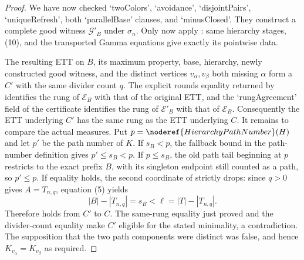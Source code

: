 \begin{proof}
We have now checked `twoColors', `avoidance', `disjointPairs',
`uniqueRefresh', both `parallelBase' clauses, and `minusClosed'.  They
construct a complete good witness $\mathcal G'_B$ under $\sigma_n$.
Only now apply : same hierarchy stages,
(10), and the transported Gamma equations give exactly its pointwise
data.

The resulting ETT on $B$, its maximum property, base, hierarchy, newly
constructed good witness, and the distinct vertices $v_\alpha,v_\beta$
both missing $\alpha$ form a  $C'$ with
the same divider count $q$.  The explicit rounds equality returned by
 identifies the rung of
$\mathcal E_B$ with that of the original ETT, and the `rungAgreement'
field of the  certificate
identifies the rung of $\mathcal E'_B$ with that of $\mathcal E_B$.
Consequently the ETT underlying $C'$ has the same rung as the ETT
underlying $C$.  It remains to compare the actual measures.
Put $p=\noderef{HierarchyPathNumber}(H)$ and let $p'$ be the path number
of $K$.  If $s_B<p$, the fallback bound in the path-number definition
gives $p'\leq s_B<p$.  If $p\leq s_B$, the old path tail beginning at
$p$ restricts to the exact prefix $B$, with its singleton endpoint still
counted as a path, so $p'\leq p$.  If equality holds, the second
coordinate of  strictly drops:
since $q>0$ gives $A=T_{n,q}$, equation (5) yields
\[
       |B|-|T_{n,q}|=s_B<\ell=|T|-|T_{n,q}|.
\]
Therefore  holds from $C'$ to $C$.
The same-rung equality just proved and the divider-count equality make
$C'$ eligible for the stated minimality, a contradiction.  The
supposition that the two path
components were distinct was false, and hence
$K_{v_\alpha}=K_{v_\beta}$ as required.
\end{proof}
